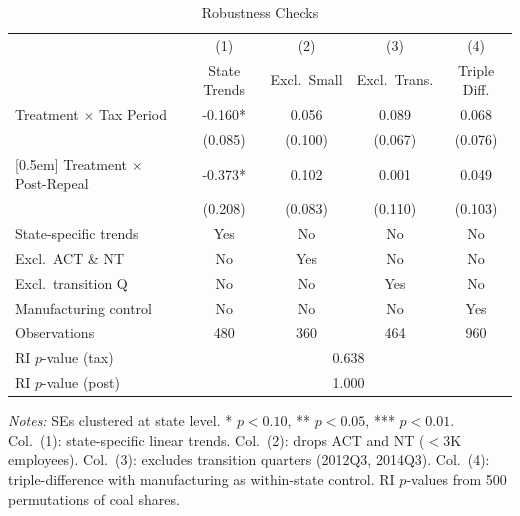 \begin{table}[H]
\centering
\caption{Robustness Checks}
\begin{threeparttable}
\small
\begin{tabular}{lcccc}
\toprule
 & (1) & (2) & (3) & (4) \\
 & State Trends & Excl.\ Small & Excl.\ Trans. & Triple Diff. \\
\midrule
Treatment $\times$ Tax Period & -0.160* & 0.056 & 0.089 & 0.068 \\
 & (0.085) & (0.100) & (0.067) & (0.076) \\{}
[0.5em]
Treatment $\times$ Post-Repeal & -0.373* & 0.102 & 0.001 & 0.049 \\
 & (0.208) & (0.083) & (0.110) & (0.103) \\
\midrule
State-specific trends & Yes & No & No & No \\
Excl.\ ACT \& NT & No & Yes & No & No \\
Excl.\ transition Q & No & No & Yes & No \\
Manufacturing control & No & No & No & Yes \\
Observations & 480 & 360 & 464 & 960 \\
RI $p$-value (tax) & \multicolumn{4}{c}{0.638} \\
RI $p$-value (post) & \multicolumn{4}{c}{1.000} \\
\bottomrule
\end{tabular}
\begin{tablenotes}[flushleft]
\small
\item \textit{Notes:} SEs clustered at state level. * $p<0.10$, ** $p<0.05$, *** $p<0.01$. Col.\ (1): state-specific linear trends. Col.\ (2): drops ACT and NT ($<$3K employees). Col.\ (3): excludes transition quarters (2012Q3, 2014Q3). Col.\ (4): triple-difference with manufacturing as within-state control. RI $p$-values from 500 permutations of coal shares.
\end{tablenotes}
\end{threeparttable}
\label{tab:robust}
\end{table}

